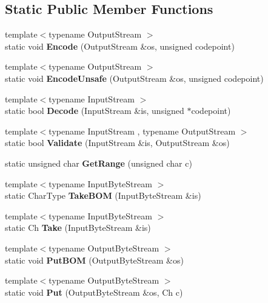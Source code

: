 \subsection*{Static Public Member Functions}
\begin{DoxyCompactItemize}
\item 
\mbox{\label{a02144_af286ed19ca60d261a9b11b65bee1298b}} 
{\footnotesize template$<$typename Output\+Stream $>$ }\\static void {\bfseries Encode} (Output\+Stream \&os, unsigned codepoint)
\item 
\mbox{\label{a02144_aac6bdaf03c114265384b2ae3e425e7a8}} 
{\footnotesize template$<$typename Output\+Stream $>$ }\\static void {\bfseries Encode\+Unsafe} (Output\+Stream \&os, unsigned codepoint)
\item 
\mbox{\label{a02144_a17c6badb31acf4f784111c886737fb17}} 
{\footnotesize template$<$typename Input\+Stream $>$ }\\static bool {\bfseries Decode} (Input\+Stream \&is, unsigned $\ast$codepoint)
\item 
\mbox{\label{a02144_a9e2e7e37d819baeb5e643654c6e61e33}} 
{\footnotesize template$<$typename Input\+Stream , typename Output\+Stream $>$ }\\static bool {\bfseries Validate} (Input\+Stream \&is, Output\+Stream \&os)
\item 
\mbox{\label{a02144_ac06bbf38df41adb0c7b9eaa93f85cc38}} 
static unsigned char {\bfseries Get\+Range} (unsigned char c)
\item 
\mbox{\label{a02144_a1b2359d6ea50ae32fefc9b28e9878a31}} 
{\footnotesize template$<$typename Input\+Byte\+Stream $>$ }\\static Char\+Type {\bfseries Take\+B\+OM} (Input\+Byte\+Stream \&is)
\item 
\mbox{\label{a02144_a5b2561a5031c8a699e593cd51b2c6864}} 
{\footnotesize template$<$typename Input\+Byte\+Stream $>$ }\\static Ch {\bfseries Take} (Input\+Byte\+Stream \&is)
\item 
\mbox{\label{a02144_a6b171e5f0662ad81d498875bbdbc536a}} 
{\footnotesize template$<$typename Output\+Byte\+Stream $>$ }\\static void {\bfseries Put\+B\+OM} (Output\+Byte\+Stream \&os)
\item 
\mbox{\label{a02144_ab24c23227413798e9be28a21eb26fe51}} 
{\footnotesize template$<$typename Output\+Byte\+Stream $>$ }\\static void {\bfseries Put} (Output\+Byte\+Stream \&os, Ch c)
\end{DoxyCompactItemize}



